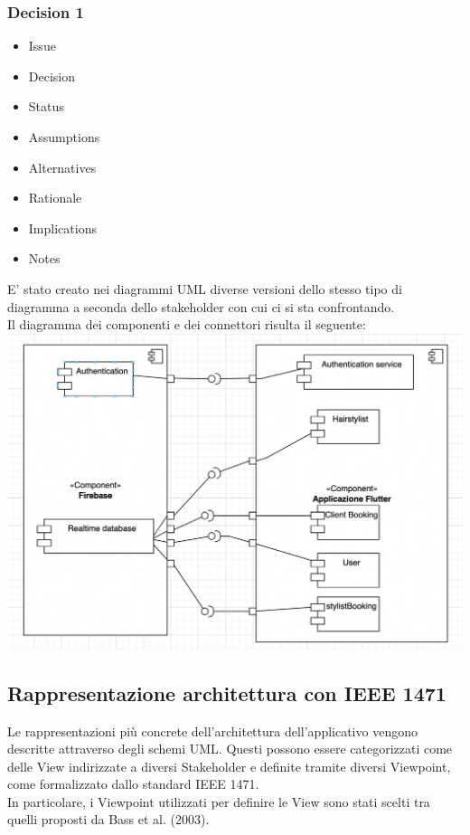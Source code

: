 \documentclass{article}
\begin{document}
\begin{itemize}
\subsubsection{Decision 1}
\begin{itemize}
\item Issue 
\item Decision
\item Status 
\item Assumptions
\item Alternatives
\item Rationale
\item Implications    
\item Notes
\end{itemize}
E' stato creato nei diagrammi UML diverse versioni dello stesso tipo di diagramma a seconda dello stakeholder
con cui ci si sta confrontando.
\\Il diagramma dei componenti e dei connettori risulta il seguente:
\\\includegraphics[scale = 0.45]{"Immagini/SoftArch.png"}

\subsection{Rappresentazione architettura con IEEE 1471} 
Le rappresentazioni più concrete dell'architettura dell'applicativo vengono descritte attraverso degli schemi UML. Questi possono essere categorizzati come delle View indirizzate a diversi Stakeholder e definite tramite diversi Viewpoint, come formalizzato dallo standard IEEE 1471.
\\In particolare, i Viewpoint utilizzati per definire le View sono stati scelti tra quelli proposti da Bass et al. (2003).

\end{itemize}
\end{document}
